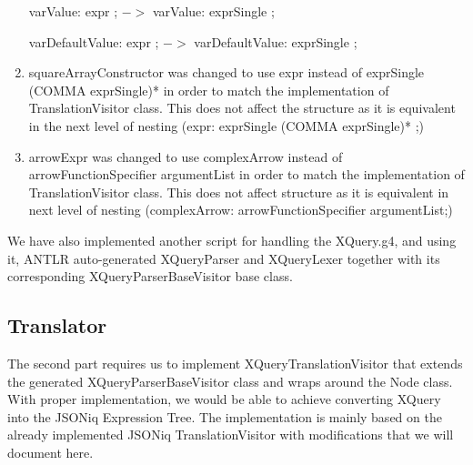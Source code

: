 \begin{enumerate}
	varValue: expr ; $->$ varValue: exprSingle ;
	
	varDefaultValue: expr ; $->$ varDefaultValue: exprSingle ;
	
	\item squareArrayConstructor was changed to use expr instead of exprSingle (COMMA exprSingle)* in order to match the implementation of TranslationVisitor class. This does not affect the structure as it is equivalent in the next level of nesting (expr: exprSingle (COMMA exprSingle)* ;)
	
	\item arrowExpr was changed to use complexArrow instead of arrowFunctionSpecifier argumentList in order to match the implementation of TranslationVisitor class. This does not affect structure as it is equivalent in next level of nesting (complexArrow: arrowFunctionSpecifier argumentList;)
\end{enumerate}

We have also implemented another script for handling the XQuery.g4, and using it, ANTLR auto-generated XQueryParser and XQueryLexer together with its corresponding XQueryParserBaseVisitor base class.

\subsection{Translator}
The second part requires us to implement XQueryTranslationVisitor that extends the generated XQueryParserBaseVisitor class and wraps around the Node class. With proper implementation, we would be able to achieve converting XQuery into the JSONiq Expression Tree. The implementation is mainly based on the already implemented JSONiq TranslationVisitor with modifications that we will document here.


